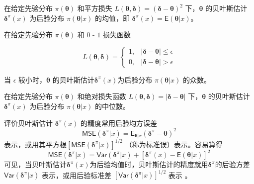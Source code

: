 \documentclass[12pt,a4paper,UTF8,twoside]{book}
\theoremstyle{definition}
\theoremstyle{definition}
\theoremstyle{definition}
\theoremstyle{remark}
\let\BeginKnitrBlock\begin \let\EndKnitrBlock\end
\begin{document}
\BeginKnitrBlock{theorem}[平方损失]
\protect\hypertarget{thm:bayes-estimate-square}{}{\label{thm:bayes-estimate-square}
{} }在给定先验分布 \(\pi(\boldsymbol{\theta})\)
和平方损失
\(L(\boldsymbol{\theta},\boldsymbol{\delta}) = (\boldsymbol{\delta} - \boldsymbol{\theta})^2\)
下，\(\boldsymbol{\theta}\) 的贝叶斯估计
\(\boldsymbol{\delta}^{\pi}(x)\) 为后验分布
\(\pi(\boldsymbol{\theta}|x)\) 的均值，即
\(\boldsymbol{\delta}^{\pi}(x) = \mathsf{E}(\boldsymbol{\theta}|x)\)\citep{mao2006}。
\EndKnitrBlock{theorem}

\BeginKnitrBlock{theorem}[0 - 1 损失]
\protect\hypertarget{thm:bayes-estimate-01}{}{\label{thm:bayes-estimate-01}
{} }在给定先验分布 \(\pi(\boldsymbol{\theta})\)
和 \(0\) - \(1\) 损失函数

\begin{equation*}
L(\boldsymbol{\theta},\boldsymbol{\delta}) = 
\begin{cases}
1, & | \boldsymbol{\delta} - \boldsymbol{\theta}| \leq \epsilon \\
0, & | \boldsymbol{\delta} - \boldsymbol{\theta}| > \epsilon
\end{cases}
\end{equation*}

当 \(\epsilon\) 较小时，\(\boldsymbol{\theta}\)
的贝叶斯估计\(\boldsymbol{\delta}^{\pi}(x)\)为后验分布
\(\pi(\boldsymbol{\theta}|x)\) 的众数\citep{mao2006}。
\EndKnitrBlock{theorem}

\BeginKnitrBlock{theorem}[绝对值损失]
\protect\hypertarget{thm:bayes-estimate-abs}{}{\label{thm:bayes-estimate-abs}
{} }在给定先验分布 \(\pi(\boldsymbol{\theta})\)
和绝对损失函数
\(L(\boldsymbol{\theta},\boldsymbol{\delta}) = |\boldsymbol{\delta} - \boldsymbol{\theta}|\)
下，\(\boldsymbol{\theta}\) 的贝叶斯估计
\(\boldsymbol{\delta}^{\pi}(x)\) 为后验分布
\(\pi(\boldsymbol{\theta}|x)\) 的中位数\citep{mao2006}。
\EndKnitrBlock{theorem}

评价贝叶斯估计 \(\boldsymbol{\delta}^{\pi}(x)\) 的精度常用后验均方误差
\[\mathsf{MSE}(\boldsymbol{\delta}^{\pi}|x) = \mathsf{E}_{\boldsymbol{\theta}|x}(\boldsymbol{\delta}^{\pi} - \boldsymbol{\theta})^2\]
表示，或用其平方根\([\mathsf{MSE}(\boldsymbol{\delta}^{\pi}|x)]^{1/2}\)
（称为标准误）表示。容易算得
\[\mathsf{MSE}(\boldsymbol{\delta}^{\pi}|x) = \mathsf{Var}(\boldsymbol{\delta}^{\pi}|x) + [\boldsymbol{\delta}^{\pi}(x) - \mathsf{E}(\boldsymbol{\theta}|x)]^2\]
可见，当贝叶斯估计\(\boldsymbol{\delta}^{\pi}(x)\)为后验均值时，贝叶斯估计的精度就用\(\boldsymbol{\delta}^{\pi}\)的后验方差\(\mathsf{Var}(\boldsymbol{\delta}^{\pi}|x)\)
表示，或用后验标准差
\([\mathsf{Var}(\boldsymbol{\delta}^{\pi}|x)]^{1/2}\) 表示
\citep{mao2006}。
\end{document}
